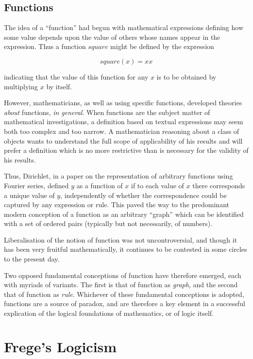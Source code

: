 \subsection{Functions}

The idea of a ``function'' had begun with mathematical expressions defining how some value depends upon the value of others whose names appear in the expression.
Thus a function $square$ might be defined by the expression

\begin{equation}
square(x) = xx
\end{equation}

indicating that the value of this function for any $x$ is to be obtained by multiplying $x$ by itself.

However, mathematicians, as well as using specific functions, developed theories {\it about} functions, {\it in general}.
When functions are the subject matter of mathematical investigations, a definition based on textual expressions may seem both too complex and too narrow.
A mathematician reasoning about a class of objects wants to understand the full scope of applicability of his results and will prefer a definition which is no more restrictive than is necessary for the validity of his results.

Thus, Dirichlet, in a paper on the representation of arbitrary functions using Fourier series, defined $y$ as a function of $x$ if to each value of $x$ there corresponds a unique value of $y$, independently of whether the correspondence could be captured by any expression or rule.
This paved the way to the predominant modern conception of a function as an arbitrary ``graph'' which can be identified with a set of ordered pairs (typically but not necessarily, of numbers).

Liberalisation of the notion of function was not uncontroversial, and though it has been very fruitful mathematically, it continues to be contested in some circles to the present day.

Two opposed fundamental conceptions of function have therefore emerged, each with myriads of variants.
The first is that of function as {\it graph}, and the second that of function as {\it rule}.
Whichever of these fundamental conceptions is adopted, functions are a source of paradox, and are therefore a key element in a successful explication of the logical foundations of mathematics, or of logic itself.


\section{Frege's Logicism}

